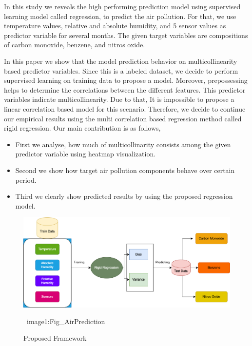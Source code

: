In this study we reveals the high performing prediction model
using supervised learning model called regression, to predict the air pollution.
For that, we use temperature values, relative and absolute humidity, 
and 5 sensor values as predictor variable for several months.
The given target variables are compositions of carbon monoxide, benzene, and nitros oxide.

{}
In this paper we show that the model prediction behavior on multicollinearity based predictor variables. 
Since this is a labeled dataset, we 
decide to perform supervised learning on training data to propose a model.
Moreover, prepossessing helps to determine the 
correlations between the different features.
This predictor variables indicate multicollinearity.
Due to that, It is impossible to propose a linear correlation based model for this scenario. 
Therefore, we decide to continue our empirical 
results using the multi correlation based regression method called rigid regression. 
Our main contribution is as follows,
\begin{itemize}
	\item First we analyse, how much of multicollinarity consists among the given predictor variable using heatmap visualization.
	\item Second we show how target air pollution components behave over certain period.
	\item Third we clearly show predicted results by using the proposed regression model.
\end{itemize}

\begin{figure}
  \centering
 \includegraphics[width=1.0\linewidth,height=0.6\linewidth]{graphics//Fig_AirPrediction.eps}
  \caption{Proposed Framework} \
  {image1:Fig_AirPrediction}
\end{figure}

